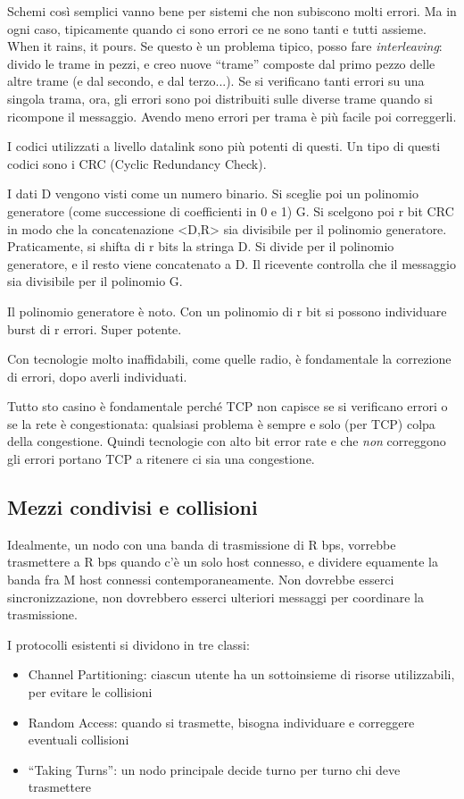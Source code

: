 Schemi cos\`i semplici vanno bene per sistemi che non subiscono molti errori. Ma in ogni caso, tipicamente quando ci sono errori ce ne sono tanti e tutti assieme. When it rains, it pours. Se questo \`e un problema tipico, posso fare \emph{interleaving}: divido le trame in pezzi, e creo nuove ``trame'' composte dal primo pezzo delle altre trame (e dal secondo, e dal terzo...). Se si verificano tanti errori su una singola trama, ora, gli errori sono poi distribuiti sulle diverse trame quando si ricompone il messaggio. Avendo meno errori per trama \`e pi\`u facile poi correggerli.

I codici utilizzati a livello datalink sono pi\`u potenti di questi. Un tipo di questi codici sono i CRC (Cyclic Redundancy Check).

I dati D vengono visti come un numero binario. Si sceglie poi un polinomio generatore (come successione di coefficienti in 0 e 1) G. Si scelgono poi r bit CRC in modo che la concatenazione <D,R> sia divisibile per il polinomio generatore. Praticamente, si shifta di r bits la stringa D. Si divide per il polinomio generatore, e il resto viene concatenato a D. Il ricevente controlla che il messaggio sia divisibile per il polinomio G.

Il polinomio generatore \`e noto. Con un polinomio di r bit si possono individuare burst di r errori. Super potente.

Con tecnologie molto inaffidabili, come quelle radio, \`e fondamentale la correzione di errori, dopo averli individuati.

Tutto sto casino \`e fondamentale perch\'e TCP non capisce se si verificano errori o se la rete \`e congestionata: qualsiasi problema \`e sempre e solo (per TCP) colpa della congestione. Quindi tecnologie con alto bit error rate e che \emph{non} correggono gli errori portano TCP a ritenere ci sia una congestione.

\subsection{Mezzi condivisi e collisioni}

Idealmente, un nodo con una banda di trasmissione di R bps, vorrebbe trasmettere a R bps quando c'\`e un solo host connesso, e dividere equamente la banda fra M host connessi contemporaneamente. Non dovrebbe esserci sincronizzazione, non dovrebbero esserci ulteriori messaggi per coordinare la trasmissione.

I protocolli esistenti si dividono in tre classi:
\begin{itemize}
    \item Channel Partitioning: ciascun utente ha un sottoinsieme di risorse utilizzabili, per evitare le collisioni
    \item Random Access: quando si trasmette, bisogna individuare e correggere eventuali collisioni
    \item ``Taking Turns'': un nodo principale decide turno per turno chi deve trasmettere
\end{itemize}

